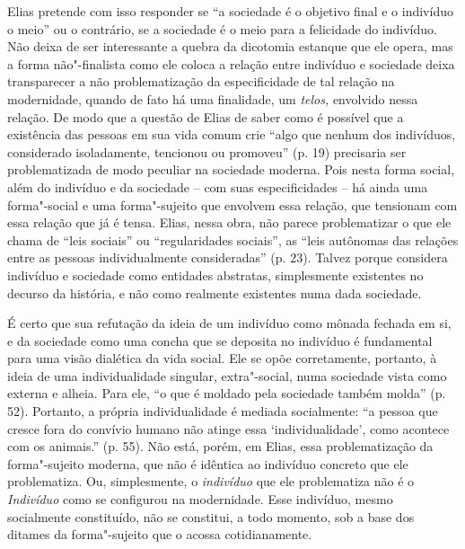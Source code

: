 Elias pretende com isso responder se ``a sociedade é o objetivo final e
o indivíduo o meio'' ou o contrário, se a sociedade é o meio para a
felicidade do indivíduo. Não deixa de ser interessante a quebra da
dicotomia estanque que ele opera, mas a forma não"-finalista como ele
coloca a relação entre indivíduo e sociedade deixa transparecer a não
problematização da especificidade de tal relação na modernidade, quando
de fato há uma finalidade, um \emph{telos,} envolvido nessa relação. De
modo que a questão de Elias de saber como é possível que a existência
das pessoas em sua vida comum crie ``algo que nenhum dos indivíduos,
considerado isoladamente, tencionou ou promoveu'' (p. 19) precisaria ser
problematizada de modo peculiar na sociedade moderna. Pois nesta forma
social, além do indivíduo e da sociedade -- com suas especificidades --
há ainda uma forma"-social e uma forma"-sujeito que envolvem essa relação,
que tensionam com essa relação que já é tensa. Elias, nessa obra, não
parece problematizar o que ele chama de ``leis sociais'' ou
``regularidades sociais'', as ``leis autônomas das relações entre as
pessoas individualmente consideradas'' (p. 23). Talvez porque considera
indivíduo e sociedade como entidades abstratas, simplesmente existentes
no decurso da história, e não como realmente existentes numa dada
sociedade.

É certo que sua refutação da ideia de um indivíduo como mônada fechada
em si, e da sociedade como uma concha que se deposita no indivíduo é
fundamental para uma visão dialética da vida social. Ele se opõe
corretamente, portanto, à ideia de uma individualidade singular,
extra"-social, numa sociedade vista como externa e alheia. Para ele, ``o
que é moldado pela sociedade também molda'' (p. 52). Portanto, a própria
individualidade é mediada socialmente: ``a pessoa que cresce fora do
convívio humano não atinge essa `individualidade', como acontece com os
animais.'' (p. 55). Não está, porém, em Elias, essa problematização da
forma"-sujeito moderna, que não é idêntica ao indivíduo concreto que ele
problematiza. Ou, simplesmente, o \emph{indivíduo} que ele problematiza
não é o \emph{Indivíduo} como se configurou na modernidade. Esse
indivíduo, mesmo socialmente constituído, não se constitui, a todo
momento, sob a base dos ditames da forma"-sujeito que o acossa
cotidianamente.

